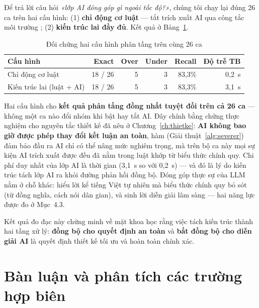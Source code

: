 Để trả lời câu hỏi \emph{«lớp AI đóng góp gì ngoài tốc độ?»}, chúng tôi chạy lại
đúng 26 ca trên hai cấu hình: (1) \textbf{chỉ động cơ luật} — tắt trích xuất AI
qua công tắc môi trường ; (2) \textbf{kiến trúc lai
đầy đủ}. Kết quả ở Bảng~\ref{tab:ablation}.

\begin{table}[H]
\centering
\caption{Đối chứng hai cấu hình phân tầng trên cùng 26 ca}
\label{tab:ablation}
\small
\setlength{\tabcolsep}{3.5pt}
\begin{tabular}{|l|r|r|r|r|r|}
\toprule
\textbf{Cấu hình} & \textbf{Exact} & \textbf{Over} & \textbf{Under} & \textbf{Recall} & \textbf{Độ trễ TB} \\
\midrule
Chỉ động cơ luật & 18 / 26 & 5 & 3 & 83,3\% & 0,2~s \\
Kiến trúc lai (luật + AI) & 18 / 26 & 5 & 3 & 83,3\% & 3,1~s \\
\bottomrule
\end{tabular}
\end{table}

Hai cấu hình cho \textbf{kết quả phân tầng đồng nhất tuyệt đối trên cả 26 ca} —
không một ca nào đổi nhóm khi bật hay tắt AI. Đây chính bằng chứng thực nghiệm
cho nguyên tắc thiết kế đã nêu ở Chương~\ref{ch:thietke}: \textbf{AI không bao
giờ được phép thay đổi kết luận an toàn}, hàm  (Giải
thuật~\ref{alg:severer}) đảm bảo đầu ra AI chỉ có thể nâng mức nghiêm trọng,
mà trên bộ ca này mọi sự kiện AI trích xuất được đều đã nằm trong luật khớp
từ biểu thức chính quy. Chi phí duy nhất của lớp AI là thời gian (3,1~s so với
0,2~s) — và đó là lý do kiến trúc tách lớp AI ra khỏi đường phản hồi đồng bộ.
Đóng góp thực sự của LLM nằm ở chỗ khác: hiểu lời kể tiếng Việt tự nhiên mà
biểu thức chính quy bỏ sót (từ đồng nghĩa, cách nói dân gian), và sinh lời diễn
giải lâm sàng — hai năng lực được đo ở Mục~4.3.

Kết quả đo đạc này chứng minh về mặt khoa học rằng việc tách kiến trúc thành hai
tầng xử lý: \textbf{đồng bộ cho quyết định an toàn} và \textbf{bất đồng bộ cho
diễn giải AI} là quyết định thiết kế tối ưu và hoàn toàn chính xác.

\section{Bàn luận và phân tích các trường hợp biên}

